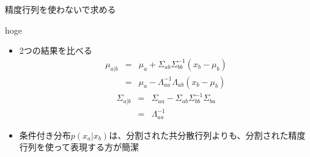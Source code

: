                       \begin{frame}{精度行列を使わないで求める}

                      \end{frame}

                        \begin{frame}{hoge}
                         \begin{itemize}
                          \item 2つの結果を比べる
                                \begin{eqnarray*}
                                 \mu_{a|b} &=& \mu_a + \Sigma_{ab}\Sigma_{bb}^{-1}(x_b-\mu_b)\\
                                 &=& \mu_a-\Lambda_{aa}^{-1}\Lambda_{ab}(x_b-\mu_b)
                                \end{eqnarray*}
                                \begin{eqnarray*}
                                 \Sigma_{a|b} &=& \Sigma_{aa} - \Sigma_{ab}\Sigma_{bb}^{-1}\Sigma_{ba} \\
                                 & =& \Lambda_{aa}^{-1}
                                \end{eqnarray*}
                          \item 条件付き分布$p(x_a|x_b)$は、分割された共分散行列よりも、分割された精度行列を使って表現する方が簡潔
                         \end{itemize}
                        \end{frame}


